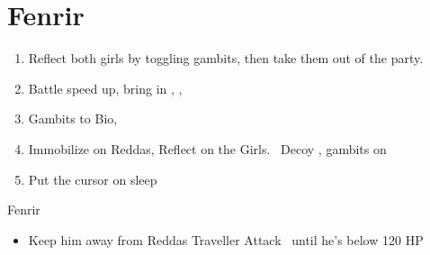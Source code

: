 \chapter{Fenrir}

\begin{enumerate}
\item Reflect both girls by toggling gambits, then take them out of the party.
\item Battle speed up, bring in \balthier, \ashe, \penelo
\item Gambits to Bio, \leader{\balthier}
\item Immobilize on Reddas, Reflect on the Girls. \ashe\ Decoy \balthier, gambits on
\item Put the cursor on sleep
\end{enumerate}
\begin{battle}{Fenrir}
\begin{itemize}
\balthierf Run backwards diagonal, spam Sleep
\item Keep him away from Reddas
\balthierf Traveller
\balthierf Attack \balthier\ until he's below 120 HP
\end{itemize}
\end{battle}